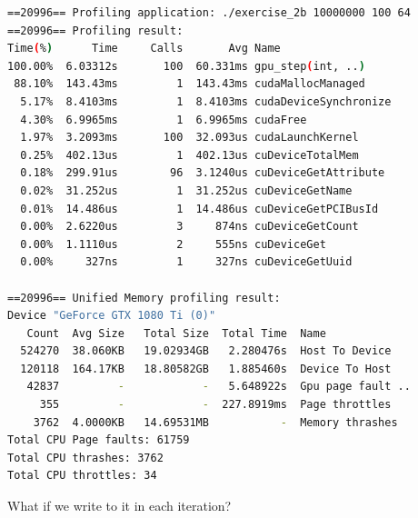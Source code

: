 \documentclass{article}
\begin{document}
\begin{mdframed}[backgroundcolor=codeColor,leftmargin=0.0cm,hidealllines=true,%
  innerleftmargin=0.1cm,innerrightmargin=0.1cm,innertopmargin=0.5cm,innerbottommargin=0.10cm,
  roundcorner=15pt]
\begin{lstlisting}[language=bash]
==20996== Profiling application: ./exercise_2b 10000000 100 64
==20996== Profiling result:
Time(%)      Time     Calls       Avg Name
100.00%  6.03312s       100  60.331ms gpu_step(int, ..)
 88.10%  143.43ms         1  143.43ms cudaMallocManaged
  5.17%  8.4103ms         1  8.4103ms cudaDeviceSynchronize
  4.30%  6.9965ms         1  6.9965ms cudaFree
  1.97%  3.2093ms       100  32.093us cudaLaunchKernel
  0.25%  402.13us         1  402.13us cuDeviceTotalMem
  0.18%  299.91us        96  3.1240us cuDeviceGetAttribute
  0.02%  31.252us         1  31.252us cuDeviceGetName
  0.01%  14.486us         1  14.486us cuDeviceGetPCIBusId
  0.00%  2.6220us         3     874ns cuDeviceGetCount
  0.00%  1.1110us         2     555ns cuDeviceGet
  0.00%     327ns         1     327ns cuDeviceGetUuid

==20996== Unified Memory profiling result:
Device "GeForce GTX 1080 Ti (0)"
   Count  Avg Size   Total Size  Total Time  Name
  524270  38.060KB   19.02934GB   2.280476s  Host To Device
  120118  164.17KB   18.80582GB   1.885460s  Device To Host
   42837         -            -   5.648922s  Gpu page fault ..
     355         -            -  227.8919ms  Page throttles
    3762  4.0000KB   14.69531MB           -  Memory thrashes
Total CPU Page faults: 61759
Total CPU thrashes: 3762
Total CPU throttles: 34
\end{lstlisting}
\end{mdframed}

What if we write to it in each iteration?

\newpage 
\end{document}

